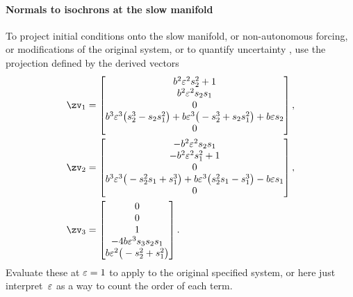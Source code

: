 \paragraph{Normals to isochrons at the slow manifold}
To project initial conditions
onto the slow manifold, or non-autonomous
forcing, or modifications of the original system, or to quantify uncertainty \cite[]{Roberts89b, Roberts97b}, use the projection defined by the derived vectors
\begin{align*}&
\zv_1 =\begin{bmatrix}
b^{2} \eps^{2} s_{2}^{2}+1\\
b^{2} \eps^{2} s_{2} s_{1}\\
0\\
b^{3} \eps^{3} \big(s_{2}^{3}-s_{2} s_{1}^{2}\big)+b \eps^{3} 
\big(-s_{2}^{3}+s_{2} s_{1}^{2}\big)+b \eps s_{2}\\
0
\end{bmatrix},\\&
\zv_2 =\begin{bmatrix}
-b^{2} \eps^{2} s_{2} s_{1}\\
-b^{2} \eps^{2} s_{1}^{2}+1\\
0\\
b^{3} \eps^{3} \big(-s_{2}^{2} s_{1}+s_{1}^{3}\big)+b \eps^{3} 
\big(s_{2}^{2} s_{1}-s_{1}^{3}\big)-b \eps s_{1}\\
0
\end{bmatrix},\\&
\zv_3 =\begin{bmatrix}
0\\
0\\
1\\
-4 b \eps^{3} s_{3} s_{2} s_{1}\\
b \eps^{2} \big(-s_{2}^{2}+s_{1}^{2}\big)
\end{bmatrix}.
\end{align*}
Evaluate these at \(\varepsilon=1\) to apply to the original specified system, or here just interpret~\(\varepsilon\) as a way to count the order of each term.


